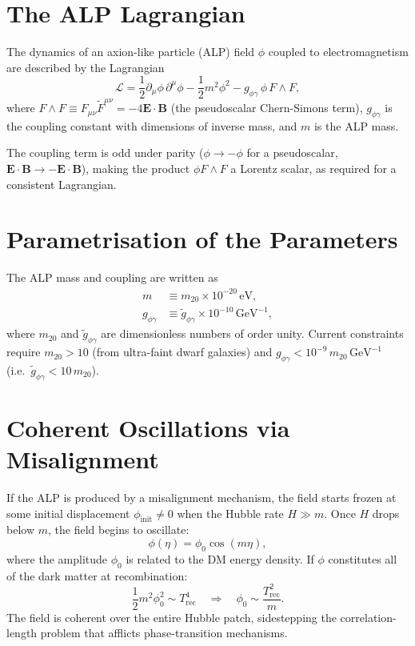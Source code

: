 \documentclass[12pt,a4paper]{report}
\newcommand{\gag}{g_{\phi\gamma}}
\newcommand{\gtag}{\tilde{g}_{\phi\gamma}}
\renewcommand{\vec}[1]{\boldsymbol{#1}}
\newcommand{\phizero}{\phi_0}
\theoremstyle{definition}
\begin{document}
\section{The ALP Lagrangian}

The dynamics of an axion-like particle (ALP) field $\phi$ coupled to electromagnetism
are described by the Lagrangian
\begin{equation}
  \mathcal{L} = \frac{1}{2}\partial_\mu\phi\,\partial^\mu\phi
              - \frac{1}{2}m^2\phi^2
              - \gag\,\phi\,F\wedge F,
  \label{eq:ALP_Lagrangian}
\end{equation}
where $F\wedge F \equiv F_{\mu\nu}\tilde{F}^{\mu\nu} = -4\vec{E}\cdot\vec{B}$
(the pseudoscalar Chern-Simons term), $\gag$ is the coupling constant with
dimensions of inverse mass, and $m$ is the ALP mass.

The coupling term is odd under parity ($\phi\to-\phi$ for a pseudoscalar,
$\vec{E}\cdot\vec{B}\to-\vec{E}\cdot\vec{B}$), making the product
$\phi F\wedge F$ a Lorentz scalar, as required for a consistent Lagrangian.

\section{Parametrisation of the Parameters}

The ALP mass and coupling are written as
\begin{align}
  m &\equiv m_{20}\times 10^{-20}\,\mathrm{eV},
  \label{eq:m_param}\\
  \gag &\equiv \gtag\times 10^{-10}\,\mathrm{GeV}^{-1},
  \label{eq:g_param}
\end{align}
where $m_{20}$ and $\gtag$ are dimensionless numbers of order unity. Current constraints
require $m_{20}>10$ (from ultra-faint dwarf galaxies) and
$\gag < 10^{-9}\,m_{20}\,\mathrm{GeV}^{-1}$ (i.e.\ $\gtag < 10\,m_{20}$).

\section{Coherent Oscillations via Misalignment}

If the ALP is produced by a misalignment mechanism, the field starts frozen at some
initial displacement $\phi_{\mathrm{init}}\neq 0$ when the Hubble rate $H\gg m$.
Once $H$ drops below $m$, the field begins to oscillate:
\begin{equation}
  \phi(\eta) = \phizero\cos(m\eta),
  \label{eq:phi_osc}
\end{equation}
where the amplitude $\phizero$ is related to the DM energy density. If $\phi$
constitutes all of the dark matter at recombination:
\begin{equation}
  \frac{1}{2}m^2\phizero^2 \sim T_{\mathrm{rec}}^4
  \quad\Longrightarrow\quad
  \phizero \sim \frac{T_{\mathrm{rec}}^2}{m}.
  \label{eq:phi0}
\end{equation}
The field is coherent over the entire Hubble patch, sidestepping the correlation-length
problem that afflicts phase-transition mechanisms.
\end{document}

